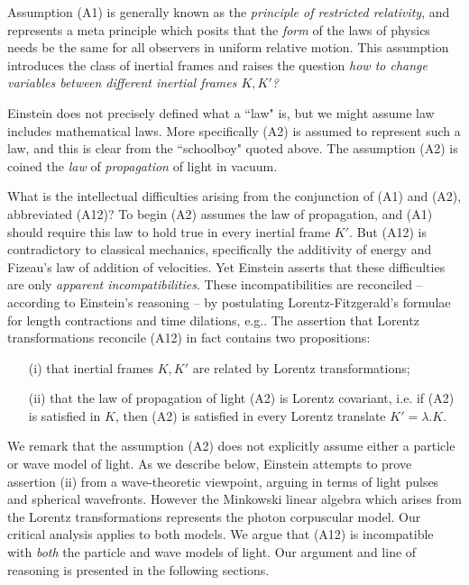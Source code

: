 \documentclass[12pt]{article}
\begin{document}
Assumption (A1) is generally known as the \emph{principle of restricted relativity}, and represents a meta principle which posits that the \emph{form} of the laws of physics needs be the same for all observers in uniform relative motion. This assumption introduces the class of inertial frames and raises the question \emph{how to change variables between different inertial frames $K, K'$?}

Einstein does not precisely defined what a ``law" is, but we might assume law includes mathematical laws. More specifically (A2) is assumed to represent such a law, and this is clear from the ``schoolboy" quoted above. The assumption (A2) is coined the \emph{law} of \emph{propagation} of light in vacuum. 

What is the intellectual difficulties arising from the conjunction of (A1) and (A2), abbreviated (A12)? To begin (A2) assumes the law of propagation, and (A1) should require this law to hold true in every inertial frame $K'$. But (A12) is contradictory to classical mechanics, specifically the additivity of energy and Fizeau's law of addition of velocities. Yet Einstein asserts that these difficulties are only \emph{apparent incompatibilities}. These incompatibilities are reconciled -- according to Einstein's reasoning -- by postulating Lorentz-Fitzgerald's formulae for length contractions and time dilations, e.g.\cite[Ch.XIV]{michelson}. The assertion that Lorentz transformations reconcile (A12) in fact contains two propositions: 

\begin{itemize}
\item[(i)] that inertial frames $K, K'$ are related by Lorentz transformations; 

\item[(ii)] that the law of propagation of light (A2) is Lorentz covariant, i.e. if (A2) is satisfied in $K$, then (A2) is satisfied in every Lorentz translate $K'=\lambda.K$.
\end{itemize}

We remark that the assumption (A2) does not explicitly assume either a particle or wave model of light. As we describe below, Einstein attempts to prove assertion (ii) from a wave-theoretic viewpoint, arguing in terms of light pulses and spherical wavefronts. However the Minkowski linear algebra which arises from the Lorentz transformations represents the photon corpuscular model. Our critical analysis applies to both models. We argue that (A12) is incompatible with \emph{both} the particle and wave models of light. Our argument and line of reasoning is presented in the following sections.  
\end{document}

